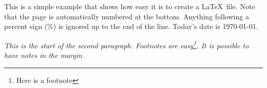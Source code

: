 \documentclass[a4paper,12pt]{article}
\begin{document}
This is a simple example that shows how easy it is to create a
\LaTeX\ file.
Note that the page is automatically numbered at the bottom.
Anything following a percent sign (\%) is ignored up to the end of
the line. %
Today's date is \today.

\textsl {This is the start of the second paragraph.
{\emph Footnotes} are easy\footnote{Here is a footnote}.
It is possible to have notes in the margin.}
\end{document}
